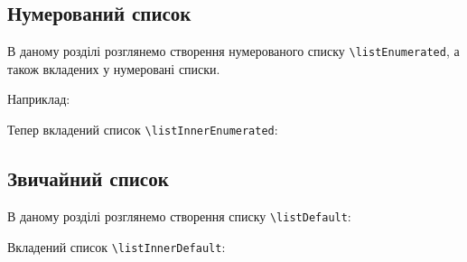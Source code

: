 \documentclass{lib/styles/default-style}
\begin{document}
\pagestyle{no-numbered}

\subsection*{\textbf{Нумерований список}}

В даному розділі розглянемо створення нумерованого списку \verb+\listEnumerated+,
а також вкладених у нумеровані списки.

Наприклад:

Тепер вкладений список \verb+\listInnerEnumerated+:

\subsection*{\textbf{Звичайний список}}

В даному розділі розглянемо створення списку \verb+\listDefault+:

Вкладений список \verb+\listInnerDefault+:
\end{document}
